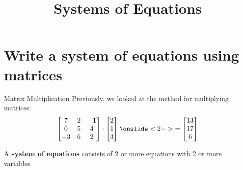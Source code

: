 \documentclass[t]{beamer}
\title{Systems of Equations}
\author{}
\date{}
\begin{document}
\begin{frame} 
\maketitle
\end{frame}

\section{Write a system of equations using matrices}

\begin{frame}{Matrix Multiplication}
Previously, we looked at the method for multiplying matrices:
\[
\begin{bmatrix}
7	&	2	&	-1	\\
0	&	5	&	4	\\
-3	&	6	&	2	\\
\end{bmatrix}
\cdot
\begin{bmatrix}
2	\\ 1 \\ 3 \\
\end{bmatrix}
\onslide<2->{= \begin{bmatrix}
13 \\ 17 \\ 6 \\
\end{bmatrix}}
\] 
\end{frame}

\begin{frame}
\begin{tcolorbox}[colframe=green!20!black, colback = green!30!white,title=\textbf{System of Equations}]
A \textbf{system of equations} consists of 2 or more equations with 2 or more variables.
\end{tcolorbox}
\vspace{6pt}
\end{frame}
\end{document}
